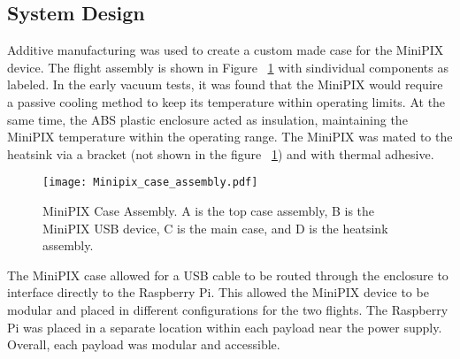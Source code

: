 \subsection{System Design}
Additive manufacturing was used to create a custom made case for the MiniPIX device.  The flight assembly is shown in Figure ~\ref{fig:minipix_case} with sindividual components as labeled.  In the early vacuum tests, it was found that the MiniPIX would require a passive cooling method to keep its temperature within operating limits.  At the same time, the ABS plastic enclosure acted as insulation, maintaining the MiniPIX temperature within the operating range.  The MiniPIX was mated to the heatsink via a bracket (not shown in the figure ~\ref{fig:minipix_case}) and with thermal adhesive.
\begin{figure}[H]
    \centering
    \texttt{[image: Minipix\_case\_assembly.pdf]} %
    \caption{MiniPIX Case Assembly. A is the top case assembly, B is the MiniPIX USB device, C is the main case, and D is the heatsink assembly.}
    \label{fig:minipix_case}
\end{figure}
The MiniPIX case allowed for a USB cable to be routed through the enclosure to interface directly to the Raspberry Pi.  This allowed the MiniPIX device to be modular and placed in different configurations for the two flights.  The Raspberry Pi was placed in a separate location within each payload near the power supply.  Overall, each payload was modular and accessible.



